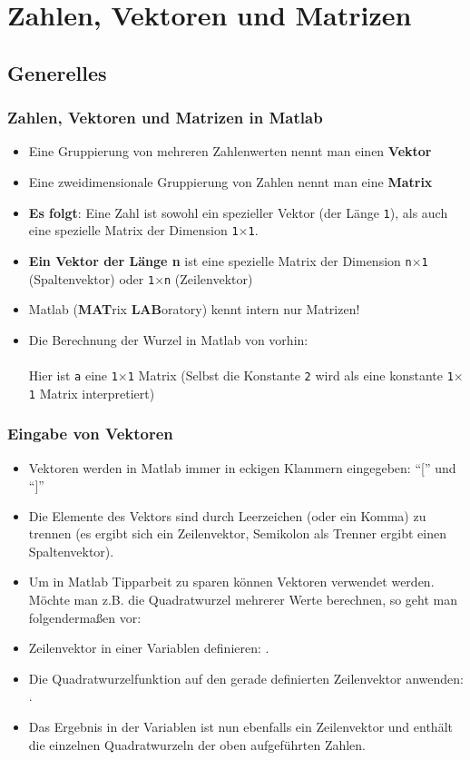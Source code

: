 \section{Zahlen, Vektoren und Matrizen}
\subsection{Generelles}
\begin{frame}
  \frametitle{Zahlen, Vektoren und Matrizen in Matlab}
  \begin{itemize}
      \item Eine Gruppierung von mehreren Zahlenwerten nennt man einen \textbf{Vektor}
      \item Eine zweidimensionale Gruppierung von Zahlen nennt man eine \textbf{Matrix}
      \item \textbf{Es folgt}: Eine Zahl ist sowohl ein spezieller Vektor (der Länge \texttt{1}), als auch eine spezielle Matrix der Dimension \texttt{1$\times$1}.
      \item \textbf{Ein Vektor der Länge n} ist eine spezielle Matrix der Dimension \texttt{n$\times$1} (Spaltenvektor) oder \texttt{1$\times$n} (Zeilenvektor)
      \item Matlab (\textbf{MAT}rix \textbf{LAB}oratory) kennt intern nur Matrizen!
      \item Die Berechnung der Wurzel in Matlab von vorhin: \\
       \\
      Hier ist \texttt{a} eine \texttt{1$\times$1} Matrix (Selbst die Konstante \texttt{2} wird als eine konstante \texttt{1$\times$1} Matrix interpretiert)
  \end{itemize}
\end{frame}

\begin{frame}
  \frametitle{Eingabe von Vektoren}

  \vspace{-0.5cm}

  \begin{itemize}
      \item Vektoren werden in Matlab immer in eckigen Klammern eingegeben: ``['' und ``]''
      \item Die Elemente des Vektors sind durch Leerzeichen (oder ein Komma) zu trennen
      (es ergibt sich ein Zeilenvektor, Semikolon als Trenner ergibt einen Spaltenvektor).
      \item Um in Matlab Tipparbeit zu sparen können Vektoren verwendet werden.
      Möchte man z.B. die Quadratwurzel mehrerer Werte berechnen, so geht man folgendermaßen vor:
      \item Zeilenvektor in einer Variablen definieren: .
      \item Die Quadratwurzelfunktion auf den gerade definierten Zeilenvektor  anwenden: .
      \item Das Ergebnis in der Variablen  ist nun ebenfalls ein Zeilenvektor und enthält die einzelnen
      Quadratwurzeln der oben aufgeführten Zahlen.
  \end{itemize}
\end{frame}

